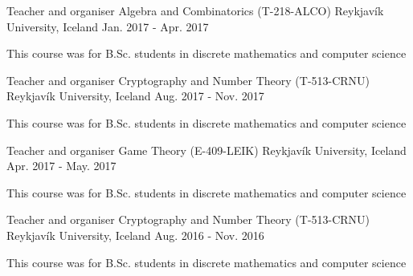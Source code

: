 


\begin{cventries}

\cventry
  {Teacher and organiser} %
  {Algebra and Combinatorics (T-218-ALCO)} %
  {Reykjavík University, Iceland} %
  {Jan. 2017 - Apr. 2017} %
  {
    \begin{cvitems} %
      \item {This course was for B.Sc. students in discrete mathematics and computer science}
    \end{cvitems}
  }



\cventry
  {Teacher and organiser} %
  {Cryptography and Number Theory (T-513-CRNU)} %
  {Reykjavík University, Iceland} %
  {Aug. 2017 - Nov. 2017} %
  {
    \begin{cvitems} %
      \item {This course was for B.Sc. students in discrete mathematics and computer science}
    \end{cvitems}
  }



\cventry
  {Teacher and organiser} %
  {Game Theory (E-409-LEIK)} %
  {Reykjavík University, Iceland} %
  {Apr. 2017 - May. 2017} %
  {
    \begin{cvitems} %
      \item {This course was for B.Sc. students in discrete mathematics and computer science}
    \end{cvitems}
  }


  \cventry
    {Teacher and organiser} %
    {Cryptography and Number Theory (T-513-CRNU)} %
    {Reykjavík University, Iceland} %
    {Aug. 2016 - Nov. 2016} %
    {
      \begin{cvitems} %
        \item {This course was for B.Sc. students in discrete mathematics and computer science}
      \end{cvitems}
    }


\end{cventries}

